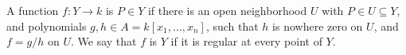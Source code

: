 A function $f: Y \to k$ is  $P \in Y$ if there is an open neighborhood $U$ with $P \in U \subseteq Y$, and polynomials $g, h \in A = k[x_1, \ldots, x_n]$, such that $h$ is nowhere zero on $U$, and $f = g/h$ on $U$. We say that $f$ is  $Y$ if it is regular at every point of $Y$.
